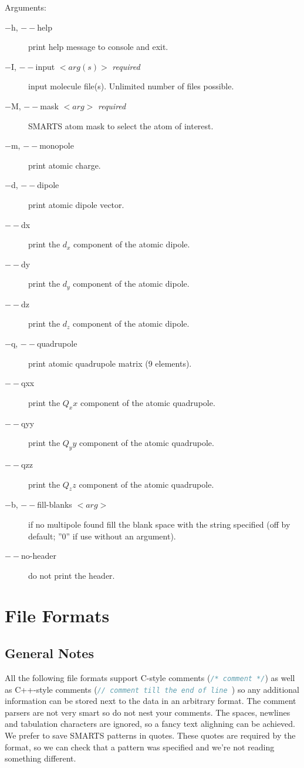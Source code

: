 \documentclass[10pt,a4paper]{article}
\begin{document}
Arguments:
\begin{description}
\item[$-$h, $--$help] print help message to console and exit.
\item[$-$I, $--$input $<arg(s)>$ \textit{required}] input molecule file(s). 
Unlimited number of files possible.
\item[$-$M, $--$mask $<arg>$ \textit{required}] SMARTS atom mask to select the 
atom of interest.
\item[$-$m, $--$monopole] print atomic charge.
\item[$-$d, $--$dipole] print atomic dipole vector.
\item[$--$dx] print the $d_x$ component of the atomic dipole.
\item[$--$dy] print the $d_y$ component of the atomic dipole.
\item[$--$dz] print the $d_z$ component of the atomic dipole.
\item[$-$q, $--$quadrupole] print atomic quadrupole matrix (9 elements).
\item[$--$qxx] print the $Q_xx$ component of the atomic quadrupole.
\item[$--$qyy] print the $Q_yy$ component of the atomic quadrupole.
\item[$--$qzz] print the $Q_zz$ component of the atomic quadrupole.
\item[$-$b, $--$fill-blanks $<arg>$] if no multipole found fill the blank space with 
the string specified (off by default; ''0'' if use without an argument). 
\item[$--$no-header] do not print the header.
\end{description}

\newpage
\section{File Formats}

\subsection{General Notes}
All the following file formats support C-style comments 
(\lstinline[language=C]{/* comment */}) as well as C++-style comments
(\lstinline[language=C]{// comment till the end of line })
so any additional information can be stored next to the data in an arbitrary format. The
comment parsers are not very smart so do not nest your comments. The spaces, newlines and
tabulation characters are ignored, so a fancy text alighning can be achieved.
We prefer to save SMARTS patterns in quotes. These quotes are required by the format, so we
can check that a pattern was specified and we're not reading something different.
\end{document}
